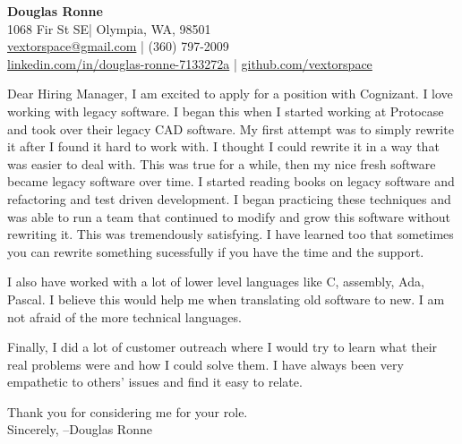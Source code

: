 \documentclass[letter,12pt]{article}
\begin{document}
\begin{center}
    {\Huge \textbf{Douglas Ronne}}\\
    \vspace{2mm}
    1068 Fir St SE| Olympia, WA, 98501\\
    \href{mailto:vextorspace@gmail.com}{vextorspace@gmail.com} | (360) 797-2009\\
    \href{www.linkedin.com/in/douglas-ronne-7133272a}{linkedin.com/in/douglas-ronne-7133272a} | \href{https://github.com/vextorspace}{github.com/vextorspace}
\end{center}

Dear Hiring Manager,
I am excited to apply for a position with Cognizant. I love working with legacy software. I began this when I started working at Protocase and took over their legacy CAD software. My first attempt was to simply rewrite it after I found it hard to work with. I thought I could rewrite it in a way that was easier to deal with. This was true for a while, then my nice fresh software became legacy software over time. I started reading books on legacy software and refactoring and test driven development. I began practicing these techniques and was able to run a team that continued to modify and grow this software without rewriting it. This was tremendously satisfying. I have learned too that sometimes you can rewrite something sucessfully if you have the time and the support.

I also have worked with a lot of lower level languages like C, assembly, Ada, Pascal. I believe this would help me when translating old software to new. I am not afraid of the more technical languages.

Finally, I did a lot of customer outreach where I would try to learn what their real problems were and how I could solve them. I have always been very empathetic to others' issues and find it easy to relate.

Thank you for considering me for your role.
\\
Sincerely,
--Douglas Ronne
\end{document}
